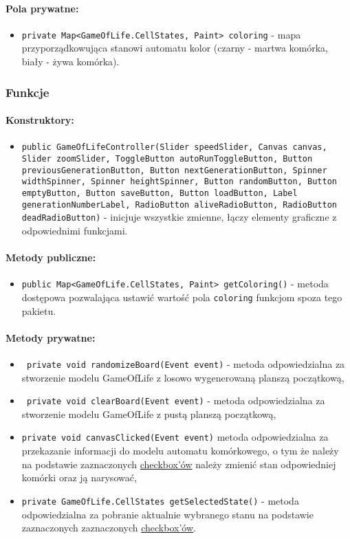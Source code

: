 \documentclass{report}
\begin{document}
\paragraph{Pola prywatne:}
\begin{itemize}
	\item \texttt{private Map<GameOfLife.CellStates, Paint> coloring} - mapa przyporządkowująca stanowi automatu kolor (czarny - martwa komórka, biały - żywa komórka).
\end{itemize}
\subsubsection{Funkcje}
\paragraph{Konstruktory:}
\begin{itemize}
\item \texttt{public GameOfLifeController(Slider speedSlider, Canvas canvas, Slider zoomSlider, ToggleButton autoRunToggleButton, Button previousGenerationButton, Button nextGenerationButton, Spinner widthSpinner, Spinner heightSpinner, Button randomButton, Button emptyButton, Button saveButton, Button loadButton, Label generationNumberLabel, RadioButton aliveRadioButton, RadioButton deadRadioButton)} - inicjuje wszystkie zmienne, łączy elementy graficzne z odpowiednimi funkcjami.
\end{itemize}
\paragraph{Metody publiczne:}
\begin{itemize}
 	\item \texttt{public Map<GameOfLife.CellStates, Paint> getColoring()} - metoda dostępowa pozwalająca ustawić wartość pola \texttt{coloring} funkcjom spoza tego pakietu.
\end{itemize}
\paragraph{Metody prywatne:}
\begin{itemize}
 	\item \texttt{ private void randomizeBoard(Event event)} - metoda odpowiedzialna za stworzenie modelu GameOfLife z losowo wygenerowaną planszą początkową,
 	\item \texttt{ private void clearBoard(Event event)} - metoda odpowiedzialna za stworzenie modelu GameOfLife z pustą planszą początkową,
 	\item \texttt{private void canvasClicked(Event event)} metoda odpowiedzialna za przekazanie informacji do modelu automatu komórkowego, o tym że należy na podstawie zaznaczonych \hyperref[sec:checkbox]{checkbox'ów} należy zmienić stan odpowiedniej komórki oraz ją narysować,
 	\item \texttt{private GameOfLife.CellStates getSelectedState()} - metoda odpowiedzialna za pobranie aktualnie wybranego stanu na podstawie zaznaczonych  zaznaczonych \hyperref[sec:checkbox]{checkbox'ów}.
\end{itemize}
\end{document}

